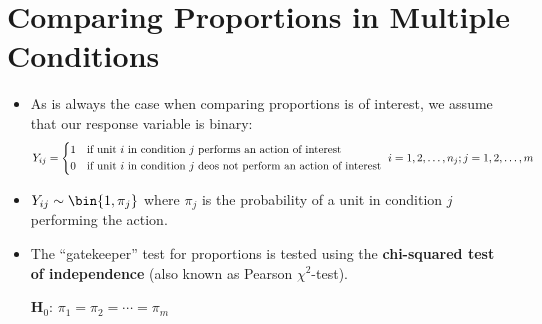 \section{Comparing Proportions in Multiple Conditions}
\begin{itemize}
      \item As is always the case when comparing proportions is of interest, we assume that our response variable
            is binary:
            \[ Y_{ij}=\begin{cases*}
                        1 & if unit $ i $ in condition $ j $ performs an action of interest         \\
                        0 & if unit $ i $ in condition $ j $ deos not perform an action of interest
                  \end{cases*}i=1,2,\ldots,n_j;j=1,2,\ldots,m \]
      \item $ Y_{ij}\sim \bin{1,\pi_j} $
            where $ \pi_j $ is the probability of a unit in condition $ j $ performing the action.
      \item The ``gatekeeper'' test for proportions is tested using the \textbf{chi-squared test
                  of independence} (also known as Pearson $ \chi^2 $-test).
            \begin{tightcenter}
                  $ \mathbf{H}_0 $: $ \pi_1=\pi_2=\cdots=\pi_m $
            \end{tightcenter}
\end{itemize}
